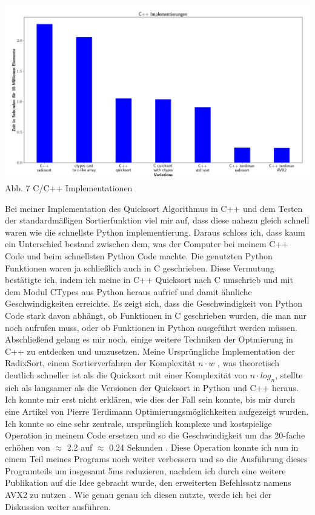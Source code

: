 \documentclass[12pt,a4paper]{article}
\begin{document}
\begin{center}
    \hspace*{-1.5cm}\includegraphics[width=1.2\textwidth]{./diagramme/matplotlib/cpp.png}
    Abb. 7 C/C++ Implementationen
\end{center}

Bei meiner Implementation des Quicksort Algorithmus in C++ und dem Testen der standardmäßigen Sortierfunktion
viel mir auf, dass diese nahezu gleich schnell waren wie die schnellste Python implementierung.
Daraus schloss ich, dass kaum ein Unterschied bestand zwischen dem, was der Computer bei meinem C++ Code und beim schnellsten Python Code machte.
Die genutzten Python Funktionen waren ja schließlich auch in C geschrieben. Diese Vermutung bestätigte ich, indem
ich meine in C++ Quicksort nach C umschrieb und mit dem Modul CTypes aus Python heraus aufrief und damit ähnliche Geschwindigkeiten
erreichte. Es zeigt sich, dass die Geschwindigkeit von Python Code stark davon abhängt, ob Funktionen in C geschrieben wurden,
die man nur noch aufrufen muss, oder ob Funktionen in Python ausgeführt werden müssen.
Abschließend gelang es mir noch, einige weitere Techniken der Optmierung in C++ zu entdecken und umzusetzen.
Meine Ursprüngliche Implementation der RadixSort, einem Sortierverfahren der Komplexität $n \cdot w$ , was theoretisch deutlich schneller ist als die Quicksort
mit einer Komplexität von $n \cdot log_{n}$, stellte sich als langsamer als die Versionen  der Quicksort in Python und C++ heraus.
Ich konnte mir erst nicht erklären, wie dies der Fall sein konnte, bis mir durch eine Artikel von Pierre Terdimann Optimierungsmöglichkeiten
aufgezeigt wurden. Ich konnte so eine sehr zentrale, ursprünglich komplexe und kostspielige Operation in meinem Code ersetzen
und so die Geschwindigkeit um das 20-fache erhöhen von $\approx$ 2.2 auf $\approx$ 0.24 Sekunden \cite{terdiman}.
Diese Operation konnte ich nun in einem Teil meines Programs noch weiter verbessern und so die Ausführung dieses Programteils
um insgesamt 5ms reduzieren, nachdem ich durch eine weitere Publikation auf die Idee gebracht wurde, den erweiterten Befehlssatz namens
AVX2 zu nutzen \cite{michael}. Wie genau genau ich diesen nutzte, werde ich bei der Diskussion weiter ausführen.
\end{document}
